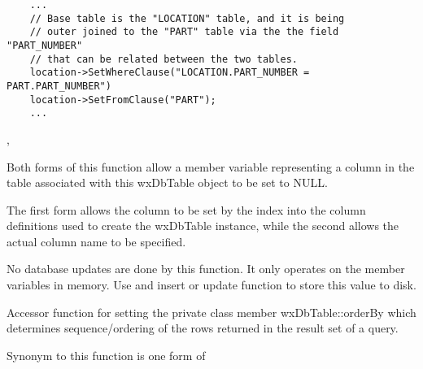 
\begin{verbatim}
    ...
    // Base table is the "LOCATION" table, and it is being
    // outer joined to the "PART" table via the the field "PART_NUMBER"
    // that can be related between the two tables.
    location->SetWhereClause("LOCATION.PART_NUMBER = PART.PART_NUMBER")
    location->SetFromClause("PART");
    ...
\end{verbatim}


, 


\label{wxdbtablesetnull}



Both forms of this function allow a member variable representing a column 
in the table associated with this wxDbTable object to be set to NULL.

The first form allows the column to be set by the index into the column 
definitions used to create the wxDbTable instance, while the second allows 
the actual column name to be specified.




No database updates are done by this function.  It only operates on the 
member variables in memory.  Use and insert or update function to store this 
value to disk.


\label{wxdbtablesetorderbyclause}


Accessor function for setting the private class member wxDbTable::orderBy 
which determines sequence/ordering of the rows returned in the result set 
of a query.

Synonym to this function is one form of 



